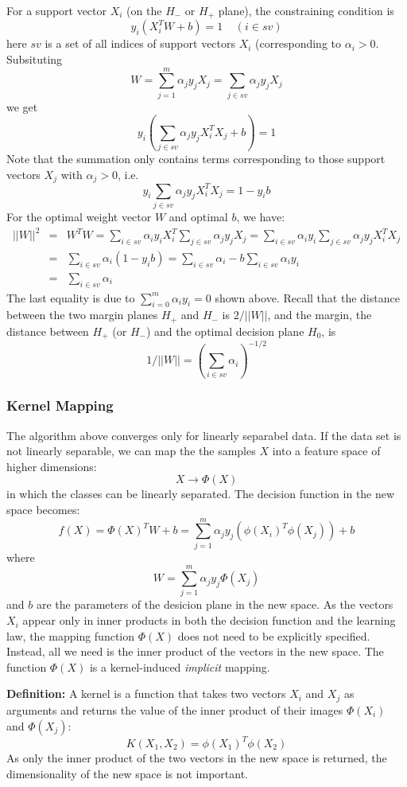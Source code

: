 For a support vector $X_i$ (on the $H_-$ or $H_+$ plane), the constraining 
condition is 
\[	y_i (X_i^T W+b) = 1\;\;\;\;(i \in sv)	\]
here $sv$ is a set of all indices of support vectors $X_i$ (corresponding 
to $\alpha_i > 0$. Subsituting 
\[	W=\sum_{j=1}^m \alpha_j y_j X_j=\sum_{j\in sv} \alpha_j y_j X_j \]
we get
\[	y_i(\sum_{j\in sv} \alpha_j y_j X^T_i X_j+b) = 1	\]
Note that the summation only contains terms corresponding to those support 
vectors $X_j$ with $\alpha_j>0$, i.e.
\[	y_i \sum_{j\in sv} \alpha_j y_j X^T_i X_j= 1-y_i b	\]
For the optimal weight vector $W$ and optimal $b$, we have:
\begin{eqnarray}
||W||^2&=&W^T W=\sum_{i\in sv} \alpha_i y_i X^T_i
	\sum_{j\in sv} \alpha_j y_j X_j	=
	\sum_{i\in sv} \alpha_i y_i 
	\sum_{j\in sv} \alpha_j y_j X^T_iX_j	\nonumber \\
&=&	\sum_{i\in sv} \alpha_i (1-y_i b)
	=\sum_{i\in sv} \alpha_i - b\sum_{i\in sv} \alpha_i y_i	\nonumber \\
&=&	\sum_{i\in sv} \alpha_i 		\nonumber 
\end{eqnarray}
The last equality is due to $\sum_{i=0}^m \alpha_i y_i=0$ shown above.
Recall that the distance between the two margin planes $H_+$ and $H_-$ is
$2/||W||$, and the margin, the distance between $H_+$ (or $H_-$) and the 
optimal decision plane $H_0$, is 
\[	1/||W||=(\sum_{i\in sv} \alpha_i)^{-1/2}	\]

\subsubsection*{Kernel Mapping}

The algorithm above converges only for linearly separabel data. If the 
data set is not linearly separable, we can map the the samples $X$ into a
feature space of higher dimensions:
\[	X \longrightarrow \Phi(X)	\]
in which the classes can be linearly separated. The decision function in 
the new space becomes:
\[ f(X)=\Phi(X)^T W+b=
\sum_{j=1}^m \alpha_j y_j (\phi(X_i)^T \phi(X_j))+b	\]
where 
\[ W=\sum_{j=1}^m \alpha_j y_j \Phi(X_j)	\]
and $b$ are the parameters of the desicion plane in the new space.
As the vectors $X_i$ appear only in inner products in both the decision
function and the learning law, the mapping function $\Phi(X)$ does not 
need to be explicitly specified. Instead, all we need is the inner 
product of the vectors in the new space. The function $\Phi(X)$ is a 
kernel-induced {\em implicit} mapping.

{\bf Definition: } A kernel is a function that takes two vectors $X_i$ 
and $X_j$ as arguments and returns the value of the inner product of
their images $\Phi(X_i)$ and $\Phi(X_j)$:
\[	K(X_1,X_2)=\phi(X_1)^T\phi(X_2) \]
As only the inner product of the two vectors in the new space is returned,
the dimensionality of the new space is not important. 

